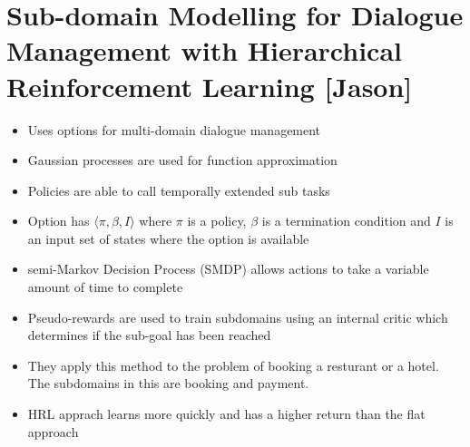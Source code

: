 \section{Sub-domain Modelling for Dialogue Management with Hierarchical Reinforcement Learning [Jason]}

\begin{itemize}
    \item Uses options for multi-domain dialogue management
    \item Gaussian processes are used for function approximation
    \item Policies are able to call temporally extended sub tasks
    \item Option has $\langle \pi , \beta ,  I \rangle$ where $\pi$ is a policy, $\beta$ is
          a termination condition and $I$ is an input set of states where the option is available
    \item semi-Markov Decision Process (SMDP) allows actions to take a variable amount of time to complete
    \item Pseudo-rewards are used to train subdomains using an internal critic which determines if
          the sub-goal has been reached
    \item They apply this method to the problem of booking a resturant or a hotel. The subdomains in this
          are booking and payment.
    \item HRL apprach learns more quickly and has a higher return than the flat approach
\end{itemize}
